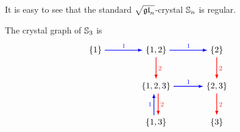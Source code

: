 \documentclass[11pt]{article}
\begin{document}
It is easy to see that the standard $\sqrt{\mathfrak{gl}_n}$-crystal $\mathbb{S}_n$ is regular.




\begin{example}
The crystal graph of $\mathbb{S}_3$ is 
\[
    \begin{tikzpicture}[xscale=2.5, yscale=1.5,>=latex,baseline=(z.base)]
    \node at (0,0.0) (z) {};
      \node at (0,0) (T0) {${\{1\}}$};
      \node at (2,0) (T1) {${\{2\}}$};
      \node at (2,-2) (T2) {${\{3\}}$};
      \node at (1,0) (U0) {${\{1,2\}}$};
      \node at (2,-1) (U1) {${\{2,3\}}$};
      \node at (1,-1) (V0) {${\{1,2,3\}}$};
      \node at (1,-2) (V1) {${\{1,3\}}$};
      \draw[->,thick,color=blue]  (T0) -- (U0) node[midway,above,scale=0.75] {$1$};
      \draw[->,thick,color=blue]  (U0) -- (T1) node[midway,above,scale=0.75] {$1$};
      \draw[->,thick,color=red]  (T1) -- (U1) node[midway,right,scale=0.75] {$2$};
      \draw[->,thick,color=red]  (U1) -- (T2) node[midway,right,scale=0.75] {$2$};
      \draw[->,thick,color=red]  (U0) -- (V0) node[midway,right,scale=0.75] {$2$};
      \draw[->,thick,color=red]  ([xshift=1pt]V0.south) -- ([xshift=1pt]V1.north) node[midway,right,scale=0.75] {$2$};
      \draw[->,thick,color=blue]  ([xshift=-1pt]V1.north) -- ([xshift=-1pt]V0.south) node[midway,left,scale=0.75] {$1$};
      \draw[->,thick,color=blue]  (V0) -- (U1) node[midway,above,scale=0.75] {$1$};
     \end{tikzpicture}
\]
\end{example}
\end{document}
